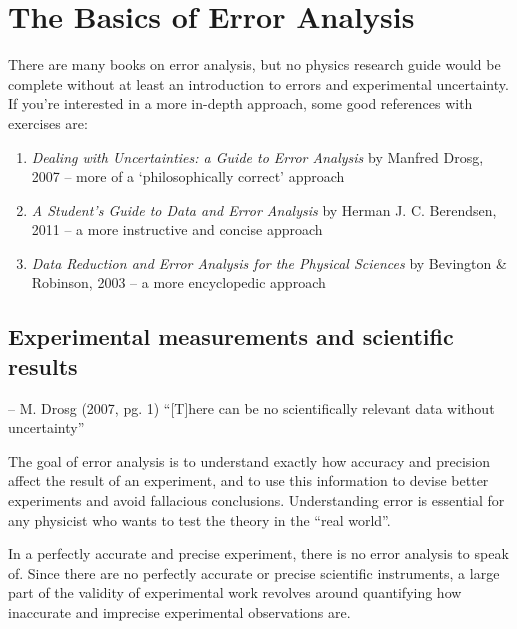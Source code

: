 

\chapter{The Basics of Error Analysis}

There are many books on error analysis, but no physics research guide would be complete without at least an introduction to errors and experimental uncertainty. If you're interested in a more in-depth approach, some good references with exercises are:
\begin{enumerate}
\item \emph{Dealing with Uncertainties: a Guide to Error Analysis} by Manfred Drosg, 2007 -- more of a `philosophically correct' approach
\item \emph{A Student's Guide to Data and Error Analysis} by Herman J. C. Berendsen, 2011 -- a more instructive and concise approach
\item \emph{Data Reduction and Error Analysis for the Physical Sciences} by Bevington \& Robinson, 2003 -- a more encyclopedic approach
\end{enumerate}

\section{Experimental measurements and scientific results}

\begin{aquote}{-- M. Drosg (2007, pg. 1)}
``[T]here can be no scientifically relevant data without uncertainty''
\end{aquote}

The goal of error analysis is to understand exactly how accuracy and precision affect the result of an experiment, and to use this information to devise better experiments and avoid fallacious conclusions. Understanding error is essential for any physicist who wants to test the theory in the ``real world''.

In a perfectly accurate and precise experiment, there is no error analysis to speak of. Since there are no perfectly accurate or precise scientific instruments, a large part of the validity of experimental work revolves around quantifying how inaccurate and imprecise experimental observations are. 

